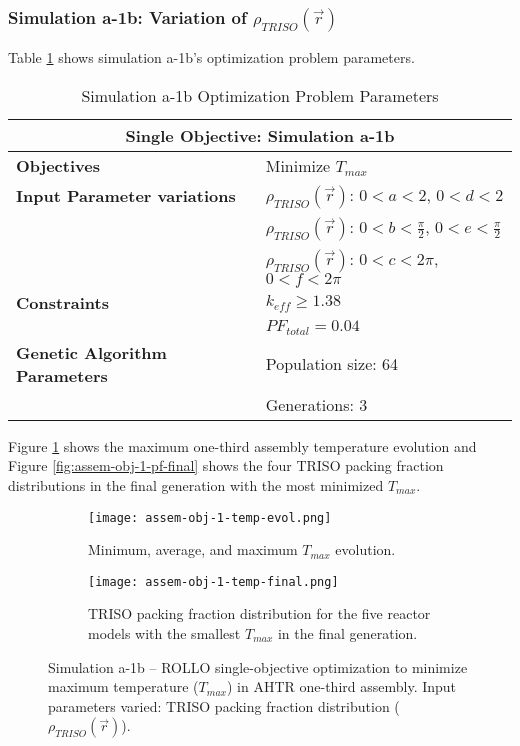 \subsubsection{Simulation a-1b: Variation of $\rho_{TRISO}(\vec{r})$}
Table \ref{tab:simulationa1b} shows simulation a-1b's optimization problem parameters. 
\begin{table}[htbp!]
    \centering
    \onehalfspacing
    \caption{Simulation a-1b Optimization Problem Parameters}
	\label{tab:simulationa1b}
    \footnotesize
    \begin{tabular}{l|p{5.3cm}}
    \hline 
    \multicolumn{2}{c}{\textbf{Single Objective: Simulation a-1b}} \\
    \hline 
    \textbf{Objectives} & Minimize $T_{max}$ \\
    \hline 
    \textbf{Input Parameter variations} 
    & $\rho_{TRISO}(\vec{r})$: $0<a<2$, $0<d<2$\\
    & $\rho_{TRISO}(\vec{r})$: $0<b<\frac{\pi}{2}$, $0<e<\frac{\pi}{2}$\\
    & $\rho_{TRISO}(\vec{r})$: $0<c<2\pi$, $0<f<2\pi$\\
    \hline
    \textbf{Constraints} & $k_{eff} \geq 1.38$\\ 
    & $PF_{total} = 0.04 $\\ 
    \hline 
    \textbf{Genetic Algorithm Parameters} & Population size: 64 \\
    & Generations: 3 \\
    \hline
    \end{tabular}
\end{table}

Figure \ref{fig:assem-obj-1-temp-evol} shows the maximum one-third assembly 
temperature evolution and Figure \ref{fig:assem-obj-1-pf-final} shows the four 
TRISO packing fraction distributions in the final generation with the most minimized 
$T_{max}$. 
\begin{figure}[htbp!]
    \centering
    \begin{subfigure}{\textwidth}
        \texttt{[image: assem-obj-1-temp-evol.png]}
        \caption{Minimum, average, and maximum $T_{max}$ evolution.}
        \label{fig:assem-obj-1-temp-evol} 
    \end{subfigure}
    \begin{subfigure}{\textwidth}
        \texttt{[image: assem-obj-1-temp-final.png]}
        \caption{TRISO packing fraction distribution for the five reactor models with the 
        smallest $T_{max}$ in the final generation.}
        \label{fig:assem-obj-1-temp-final} 
    \end{subfigure}
    \caption{Simulation a-1b -- ROLLO single-objective optimization to minimize maximum 
    temperature ($T_{max}$) in \gls{AHTR} one-third assembly. 
    Input parameters varied: \gls{TRISO} packing fraction distribution 
    ($\rho_{TRISO}(\vec{r})$).}
    \label{fig:assem-obj-1-temp}
\end{figure}

